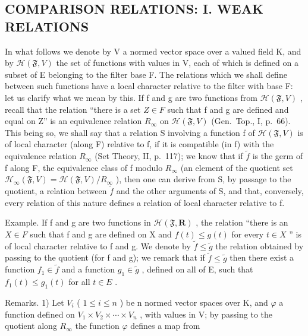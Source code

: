 \subsection{COMPARISON RELATIONS: I. WEAK RELATIONS}

In what follows we denote by V a normed vector space over a valued field K, and by \(\mathcal{H}(\mathfrak{F}, V)\) the set of functions with values in V, each of which is defined on a subset of E belonging to the filter base F. The relations which we shall define between such functions have a local character relative to the filter with base F: let us clarify what we mean by this. If f and g are two functions from \(\mathcal{H}(\mathfrak{F}, V)\) , recall that the relation ``there is a set \(Z \in F\) such that f and g are defined and equal on Z'' is an equivalence relation \(R_{\infty}\) on \(\mathcal{H}(\mathfrak{F}, V)\) (Gen.~Top., I, p.~66). This being so, we shall say that a relation S involving a function f of \(\mathcal{H}(\mathfrak{F}, V)\) is of local character (along F) relative to f, if it is compatible (in f) with the equivalence relation \(R_{\infty}\) (Set Theory, II, p.~117); we know that if \(\tilde{f}\) is the germ of f along F, the equivalence class of f modulo \(R_{\infty}\) (an element of the quotient set \(\mathcal{H}_{\infty}(\mathfrak{F}, V) = \mathcal{H}(\mathfrak{F}, V)/R_{\infty}\) ), then one can derive from S, by passage to the quotient, a relation between \(\tilde{f}\) and the other arguments of S, and that, conversely, every relation of this nature defines a relation of local character relative to f.

Example. If f and g are two functions in \(\mathcal{H}(\mathfrak{F},\mathbf{R})\) , the relation ``there is an \(X \in F\) such that f and g are defined on X and \(f(t) \leqslant g(t)\) for every \(t \in X\) '' is of local character relative to f and g. We denote by \(\tilde{f} \leqslant \tilde{g}\) the relation obtained by passing to the quotient (for f and g); we remark that if \(\tilde{f} \leqslant \tilde{g}\) then there exist a function \(f_{1} \in \tilde{f}\) and a function \(g_{1} \in \tilde{g}\) , defined on all of E, such that \(f_{1}(t) \leqslant g_{1}(t)\) for all \(t \in E\) .

Remarks. 1) Let \(V_{i}\) ( \(1 \leqslant i \leqslant n\) ) be n normed vector spaces over K, and \(\varphi\) a function defined on \(V_{1} \times V_{2} \times \cdots \times V_{n}\) , with values in V; by passing to the quotient along \(R_{\infty}\) the function \(\varphi\) defines a map from

